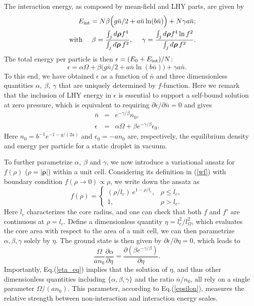 \documentclass[reprint,aps,prl,twocolumn,superscriptaddress]{revtex4-1}
\begin{document}
The interaction energy, as composed by mean-field and LHY parts, are given by
\begin{eqnarray}
&&\ \ \ \ \ \   E_{\rm int}=N\beta\Big(g\bar{n}/2 + a \bar{n}\ln(b\bar{n})\Big) + N\gamma a \bar{n}; \label{Eint} \\
&&{\rm with}  \ \ \ \ \beta = \dfrac{\int_j d\bm{\rho}f^4}{{\int_j d\bm{\rho}\, f^2}}, \ \ \ \  \gamma = \dfrac{\int_j d\bm{\rho}f^4\ln f^2}{{\int_j d\bm{\rho}\, f^2}}. \nonumber
\end{eqnarray}
The total energy per particle is then $\epsilon=(E_0+E_{\rm int})/N$:
\begin{equation}
\epsilon=\alpha\Omega+ \beta\big(g\bar{n}/2 + a \bar{n}\ln(b\bar{n})\Big) + \gamma a \bar{n}. \label{total_E}
\end{equation}
To this end, we have obtained $\epsilon$ as a function of $\bar{n}$ and three dimensionless quantities $\alpha,\ \beta,\ \gamma$ that are uniquely determined by $f$-function. Here we remark that the inclusion of LHY energy in $\epsilon$ is essential to support a self-bound solution at zero pressure, which is equivalent to requiring $\partial \epsilon/\partial \bar{n}=0$ and gives 
\begin{eqnarray}
    \bar{n}&=&e^{-\gamma/\beta}n_0, \label{nbar} \\
    \epsilon &=& \alpha\Omega + \beta e^{-\gamma/\beta} \epsilon_0.  \label{epsilon}
\end{eqnarray}
Here $n_0=b^{-1}e^{-1-g/(2a)}$ and $\epsilon_0=-an_0$ are, respectively, the equilibrium density and energy per particle for a static droplet in vacuum. 

To further parametrize $\alpha,\ \beta$ and $\gamma$, we now introduce a variational ansatz for $f(\rho)$ ($\rho=|\bm{\rho}|$) within a unit cell. Considering its definition in (\ref{wf}) with boundary condition $f(\rho\rightarrow 0)\propto \rho$, we write down the ansatz as 
\begin{equation}\label{trial_f}
    f({\rho})=\begin{cases}
        (\rho/l_c)\ e^{1-\rho/l_c}, & \rho\le l_c, \\
        1, & \rho> l_c.
    \end{cases} 
\end{equation}
Here $l_c$ characterizes the core radius, and one can check that both $f$ and $f'$ are continuous at $\rho=l_c$. Define a dimensionless quantity $\eta=l_c^2/l_{\Omega}^2$, which evaluates the core area with respect to the area of a unit cell, we can then parametrize $\alpha,\beta,\gamma$ solely by $\eta$. The ground state is then given by $\partial\epsilon /\partial \eta=0$, which leads to
\begin{equation}
  \dfrac{\Omega}{an_0}  \dfrac{\partial \alpha}{\partial \eta} =  \dfrac{\partial(\beta e^{-\gamma/\beta})}{\partial \eta}. \label{eta_eq}
\end{equation}
Importantly, Eq.(\ref{eta_eq}) implies that the solution of $\eta$, and thus other dimensionless quantities including  $\{\alpha,\beta,\gamma\}$ and the ratio $\bar{n}/n_0$, all rely on a single parameter $\Omega/(an_0)$. This parameter, according to Eq.(\ref{epsilon}), measures the relative strength between non-interaction and interaction energy scales. 
\end{document}
